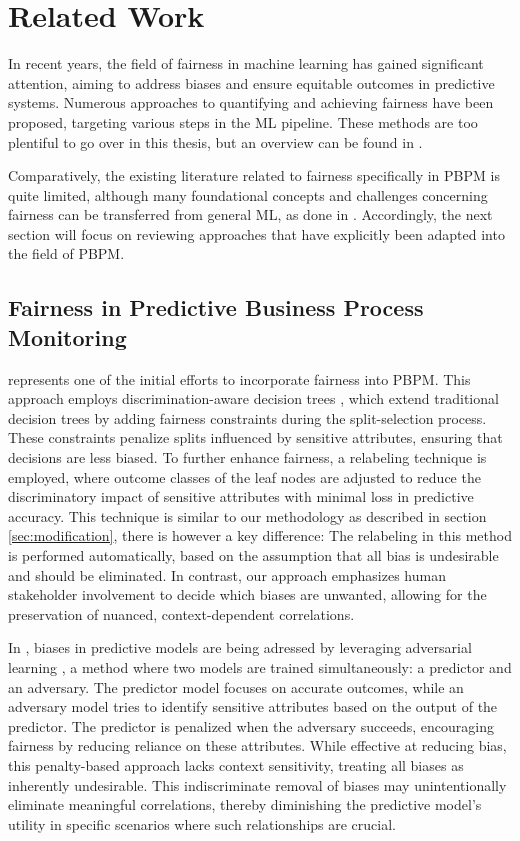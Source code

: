 \chapter{Related Work}
In recent years, the field of fairness in machine learning has gained significant attention,
aiming to address biases and ensure equitable outcomes in predictive systems.
Numerous approaches to quantifying and achieving fairness have been proposed,
targeting various steps in the ML pipeline.
These methods are too plentiful to go over in this thesis,
but an overview can be found in \cite{fairness_ml}.

Comparatively, the existing literature related to fairness specifically in PBPM is quite limited,
although many foundational concepts and challenges concerning fairness can be transferred
from general ML, as done in \cite{fairness_overview}.
Accordingly, the next section will focus on reviewing approaches
that have explicitly been adapted into the field of PBPM.

\section{Fairness in Predictive Business Process Monitoring}
\cite{fairness_foundation} represents one of the initial efforts to incorporate fairness into PBPM.
This approach employs discrimination-aware decision trees \cite{fairness_decision_tree},
which extend traditional decision trees by adding fairness constraints during the split-selection process.
These constraints penalize splits influenced by sensitive attributes,
ensuring that decisions are less biased. 
To further enhance fairness,
a relabeling technique is employed, where outcome classes of the leaf nodes are adjusted
to reduce the discriminatory impact of sensitive attributes with minimal loss in predictive accuracy.
This technique is similar to our methodology as described in section \ref{sec:modification},
there is however a key difference:
The relabeling in this method is performed automatically,
based on the assumption that all bias is undesirable and should be eliminated.
In contrast, our approach emphasizes human stakeholder involvement to decide which biases are unwanted,
allowing for the preservation of nuanced, context-dependent correlations.

In \cite{fairness_adversarial},
biases in predictive models are being adressed by leveraging adversarial learning \cite{gan},
a method where two models are trained simultaneously: a predictor and an adversary.
The predictor model focuses on accurate outcomes,
while an adversary model tries to identify sensitive attributes based on the output of the predictor.
The predictor is penalized when the adversary succeeds,
encouraging fairness by reducing reliance on these attributes.
While effective at reducing bias,
this penalty-based approach lacks context sensitivity,
treating all biases as inherently undesirable.
This indiscriminate removal of biases may unintentionally eliminate meaningful correlations,
thereby diminishing the predictive model's utility in specific scenarios
where such relationships are crucial.


